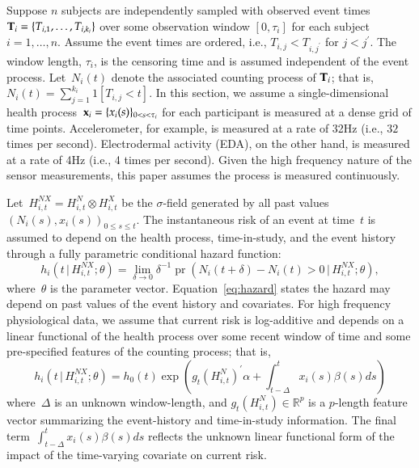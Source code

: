 \documentclass[11pt]{amsart}
\def\pr{\mathop{\text{pr}}\nolimits}
\def\pr{\mathop{\text{pr}}\nolimits}
\def\given{\, | \,}
\def\Given{\, \big | \,}
\def\bfx{{\bf x}}
\def\bfT{{\bf T}}
\begin{document}
Suppose $n$ subjects are independently sampled with observed event
times~$\bfT_{i} = \{ T_{i,1}, \ldots, T_{i,k_i}\}$ over some observation
window $[0, \tau_i]$ for each subject $i = 1,\ldots, n$.  Assume the
event times are ordered, i.e., $T_{i,j} < T_{i,j^\prime}$ for $j <
j^\prime$. The window length, $\tau_i$, is the censoring time and is
assumed independent of the event process. Let~$N_{i} (t)$ denote the
associated counting process of $\bfT_{i}$; that is, $N_i (t) =
\sum_{j=1}^{k_i} 1 [ T_{i,j} < t ]$.  
In this section, we assume a single-dimensional health process~$\bfx_i
= \{ x_i (s) \}_{0 < s < \tau_i}$ for each participant is measured at
a dense grid of time points.  Accelerometer, for example, is measured
at a rate of 32Hz (i.e., $32$ times per second). Electrodermal
activity (EDA), on the other hand, is measured at a rate of 4Hz (i.e.,
4 times per second).  Given the high frequency nature of the sensor 
measurements, this paper assumes the process is measured continuously.   

Let~$H_{i,t}^{NX} = H_{i,t}^{N} \otimes H_{i,t}^{X}$ be the $\sigma$-field
generated by all past values~$(N_i (s), x_i (s))_{0 \leq s \leq t}$.
The instantaneous risk of an event at time~$t$ is assumed to depend on
the health process, time-in-study, and the event history through a
fully parametric conditional hazard function:
\begin{equation}
\label{eq:hazard}
h_i \left( t \Given H_{i,t}^{NX} ; \theta \right) =
\lim_{\delta \to 0} \delta^{-1} \pr \left( N_i(t+\delta) - N_i(t) > 0
  \given H_{i,t}^{NX}; \theta \right), 
\end{equation}
where~$\theta$ is the parameter vector. Equation~\eqref{eq:hazard}
states the hazard may depend on past values of the event history and
covariates.  For high frequency physiological data, we assume that 
current risk is log-additive and depends on a linear functional of the
health process over some recent window of time and some pre-specified
features of the counting process; that is,  
\begin{equation}
\label{eq:hazardlinear}
h_i \left( t \given  H_{i,t}^{NX} ; \theta \right) = 
h_0 (t) \exp \left( g_t \left( H_{i,t}^{N} \right)^{\prime} \alpha
  + \int_{t-\Delta}^t x_i (s) \beta(s) ds  \right)
\end{equation}
where~$\Delta$ is an unknown window-length, and $g_t( H_{i,t}^N ) \in
\mathbb{R}^p$ is a $p$-length feature vector summarizing the
event-history and time-in-study information. The final
term~$\int_{t-\Delta}^t x_i(s) \beta(s) ds$ reflects the unknown
linear functional form of the impact of the time-varying covariate on
current risk.   
\end{document}
